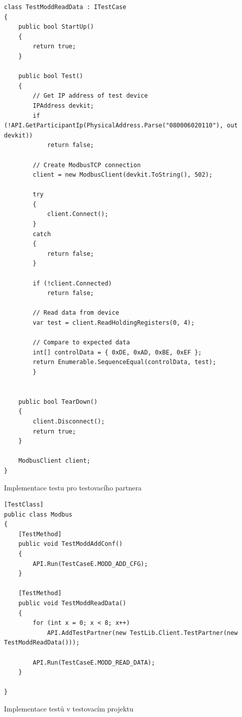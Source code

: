 \begin{listing}[p]
    \centering
    \begin{verbatim}
class TestModdReadData : ITestCase
{
    public bool StartUp()
    {
        return true;
    }

    public bool Test()
    {
        // Get IP address of test device
        IPAddress devkit;
        if (!API.GetParticipantIp(PhysicalAddress.Parse("080006020110"), out devkit))
            return false;

        // Create ModbusTCP connection
        client = new ModbusClient(devkit.ToString(), 502);

        try 
        {
            client.Connect();
        }
        catch 
        {
            return false;
        }

        if (!client.Connected)
            return false;

        // Read data from device
        var test = client.ReadHoldingRegisters(0, 4);
            
        // Compare to expected data
        int[] controlData = { 0xDE, 0xAD, 0xBE, 0xEF };
        return Enumerable.SequenceEqual(controlData, test);
        }


    public bool TearDown()
    {
        client.Disconnect();
        return true;
    }

    ModbusClient client;
}
    \end{verbatim}
\caption{Implementace testu pro testovacího partnera}
\label{listing:testcase_partner}
\end{listing}

\begin{listing}[p]
    \centering
    \begin{verbatim}
[TestClass]
public class Modbus
{
    [TestMethod]
    public void TestModdAddConf()
    {
        API.Run(TestCaseE.MODD_ADD_CFG);
    }
    
    [TestMethod]
    public void TestModdReadData()
    {
        for (int x = 0; x < 8; x++)
            API.AddTestPartner(new TestLib.Client.TestPartner(new TestModdReadData()));
    
        API.Run(TestCaseE.MODD_READ_DATA);
    }
    
}
    \end{verbatim}
\caption{Implementace testů v testovacím projektu}
\label{listing:testcase_service}
\end{listing}


